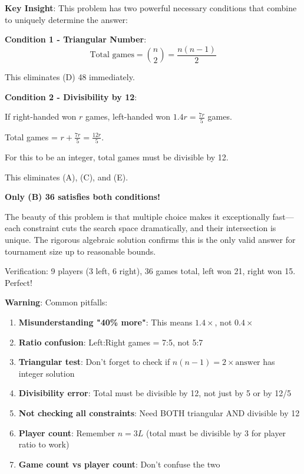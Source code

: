 \documentclass[12pt]{article}
\begin{document}
\begin{keyinsightbox}
\textbf{Key Insight}: This problem has two powerful necessary conditions that combine to uniquely determine the answer:

\textbf{Condition 1 - Triangular Number}:
$$\text{Total games} = \binom{n}{2} = \frac{n(n-1)}{2}$$

This eliminates (D) 48 immediately.

\textbf{Condition 2 - Divisibility by 12}:

If right-handed won $r$ games, left-handed won $1.4r = \frac{7r}{5}$ games.

Total games = $r + \frac{7r}{5} = \frac{12r}{5}$.

For this to be an integer, total games must be divisible by 12.

This eliminates (A), (C), and (E).

\textbf{Only (B) 36 satisfies both conditions!}

The beauty of this problem is that multiple choice makes it exceptionally fast—each constraint cuts the search space dramatically, and their intersection is unique. The rigorous algebraic solution confirms this is the only valid answer for tournament size up to reasonable bounds.

Verification: 9 players (3 left, 6 right), 36 games total, left won 21, right won 15. Perfect!
\end{keyinsightbox}

\begin{warningbox}
\textbf{Warning}: Common pitfalls:
\begin{enumerate}
    \item \textbf{Misunderstanding "40\% more"}: This means $1.4 \times$, not $0.4 \times$
    \item \textbf{Ratio confusion}: Left:Right games = 7:5, not 5:7
    \item \textbf{Triangular test}: Don't forget to check if $n(n-1) = 2 \times \text{answer}$ has integer solution
    \item \textbf{Divisibility error}: Total must be divisible by 12, not just by 5 or by 12/5
    \item \textbf{Not checking all constraints}: Need BOTH triangular AND divisible by 12
    \item \textbf{Player count}: Remember $n = 3L$ (total must be divisible by 3 for player ratio to work)
    \item \textbf{Game count vs player count}: Don't confuse the two
\end{enumerate}
\end{warningbox}
\end{document}
